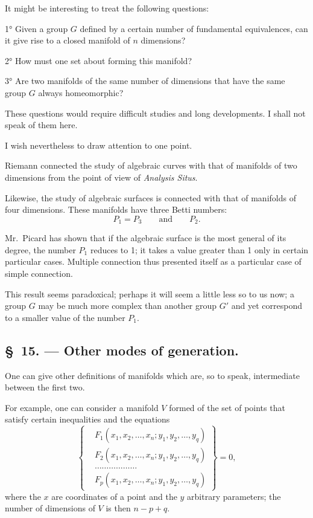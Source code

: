 \documentclass{article}
\begin{document}
It might be interesting to treat the following questions:

1° Given a group $G$ defined by a certain number of fundamental equivalences, can it give rise to a closed manifold of $n$ dimensions?

2° How must one set about forming this manifold?

3° Are two manifolds of the same number of dimensions that have the same group $G$ always homeomorphic?

These questions would require difficult studies and long developments. I shall not speak of them here.

I wish nevertheless to draw attention to one point.

Riemann connected the study of algebraic curves with that of manifolds of two dimensions from the point of view of \emph{Analysis Situs}.

Likewise, the study of algebraic surfaces is connected with that of manifolds of four dimensions. These manifolds have three Betti numbers:
\[ P_{1} = P_{3} \qquad \text{and} \qquad P_{2}. \]

Mr.~Picard has shown that if the algebraic surface is the most general of its degree, the number $P_{1}$ reduces to 1; it takes a value greater than 1 only in certain particular cases. Multiple connection thus presented itself as a particular case of simple connection.

This result seems paradoxical; perhaps it will seem a little less so to us now; a group $G$ may be much more complex than another group $G'$ and yet correspond to a smaller value of the number $P_{1}$.

\subsection*{\S~15. --- Other modes of generation.}

One can give other definitions of manifolds which are, so to speak, intermediate between the first two.

For example, one can consider a manifold $V$ formed of the set of points that satisfy certain inequalities and the equations
\[ \left\{ \begin{aligned} &F_{1}(x_{1}, x_{2}, \ldots, x_{n}; y_{1}, y_{2}, \ldots, y_{q})\\ &F_{2}(x_{1}, x_{2}, \ldots, x_{n}; y_{1}, y_{2}, \ldots, y_{q})\\ &\ldots\ldots\ldots\ldots\ldots\ldots\\ &F_{p}(x_{1}, x_{2}, \ldots, x_{n}; y_{1}, y_{2}, \ldots, y_{q}) \end{aligned} \right\} = 0, \tag{1} \]
where the $x$ are coordinates of a point and the $y$ arbitrary parameters; the number of dimensions of $V$ is then $n - p + q$.
\end{document}
